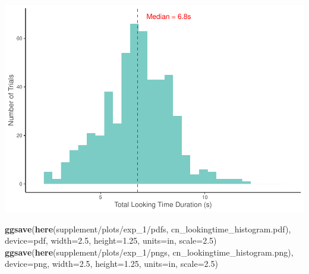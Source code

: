 \documentclass[
  doc,floatsintext]{apa6}
\newenvironment{Shaded}{\begin{snugshade}}{\end{snugshade}}
\newcommand{\AttributeTok}[1]{\textcolor[rgb]{0.13,0.29,0.53}{#1}}
\newcommand{\FloatTok}[1]{\textcolor[rgb]{0.00,0.00,0.81}{#1}}
\newcommand{\FunctionTok}[1]{\textcolor[rgb]{0.13,0.29,0.53}{\textbf{#1}}}
\newcommand{\NormalTok}[1]{#1}
\newcommand{\StringTok}[1]{\textcolor[rgb]{0.31,0.60,0.02}{#1}}
\begin{document}
\includegraphics{revised_ms_analyses_files/figure-latex/r2-cn-durations-triallooking-1.pdf}

\begin{Shaded}
\begin{Highlighting}[]
\FunctionTok{ggsave}\NormalTok{(}\FunctionTok{here}\NormalTok{(}\StringTok{\textquotesingle{}supplement/plots/exp\_1/pdfs\textquotesingle{}}\NormalTok{, }\StringTok{\textquotesingle{}cn\_lookingtime\_histogram.pdf\textquotesingle{}}\NormalTok{), }
       \AttributeTok{device=}\StringTok{\textquotesingle{}pdf\textquotesingle{}}\NormalTok{, }\AttributeTok{width=}\FloatTok{2.5}\NormalTok{, }\AttributeTok{height=}\FloatTok{1.25}\NormalTok{, }\AttributeTok{units=}\StringTok{\textquotesingle{}in\textquotesingle{}}\NormalTok{, }\AttributeTok{scale=}\FloatTok{2.5}\NormalTok{)}
\FunctionTok{ggsave}\NormalTok{(}\FunctionTok{here}\NormalTok{(}\StringTok{\textquotesingle{}supplement/plots/exp\_1/pngs\textquotesingle{}}\NormalTok{, }\StringTok{\textquotesingle{}cn\_lookingtime\_histogram.png\textquotesingle{}}\NormalTok{),}
       \AttributeTok{device=}\StringTok{\textquotesingle{}png\textquotesingle{}}\NormalTok{, }\AttributeTok{width=}\FloatTok{2.5}\NormalTok{, }\AttributeTok{height=}\FloatTok{1.25}\NormalTok{, }\AttributeTok{units=}\StringTok{\textquotesingle{}in\textquotesingle{}}\NormalTok{, }\AttributeTok{scale=}\FloatTok{2.5}\NormalTok{)}
\end{Highlighting}
\end{Shaded}
\end{document}
